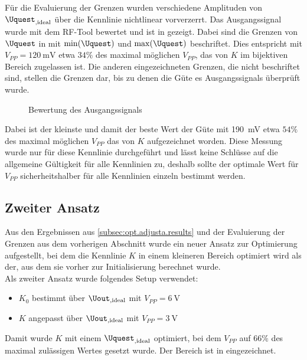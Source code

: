 \documentclass[../Report.tex]{subfiles}
\begin{document}
Für die Evaluierung der Grenzen wurden verschiedene Amplituden von $\Uquest_{,\textrm{ideal}}$ über die Kennlinie nichtlinear vorverzerrt. Das Ausgangssignal wurde mit dem RF-Tool \cite{RF-Tool} bewertet und ist in  gezeigt. Dabei sind die Grenzen von $\Uquest$ in  mit $\min(\Uquest)$ und $\max(\Uquest)$ beschriftet. Dies entspricht mit $V_{PP} = \SI{120}{\mV}$ etwa $34\%$ des maximal möglichen $V_{PP}$, das von $K$ im bijektiven Bereich zugelassen ist. Die anderen eingezeichneten Grenzen, die nicht beschriftet sind, stellen die Grenzen dar, bis zu denen die Güte es Ausgangssignals überprüft wurde.\\
\begin{figure}[H]
\begin{subfigure}{0.5 \textwidth}
	\setlength\figureheight{7.5cm}
	\setlength\figurewidth{7.5cm}
    	
	\label{fig:K0_quality}
\end{subfigure}
\begin{subfigure}{0.5 \textwidth}
	\setlength\figureheight{7.5cm}
	\setlength\figurewidth{7.5cm}
    	
	\label{fig:evaluateK.quality}
\end{subfigure}
\caption{Bewertung des Ausgangssignals}
\label{fig:evaluateK}
\end{figure}
Dabei ist der kleinste und damit der beste Wert der Güte mit \SI{190}{\mV} etwa $54\%$ des maximal möglichen $V_{PP}$ das von $K$ aufgezeichnet worden. Diese Messung wurde nur für diese Kennlinie durchgeführt und lässt keine Schlüsse auf die allgemeine Gültigkeit für alle Kennlinien zu, deshalb sollte der optimale Wert für $V_{PP}$ sicherheitshalber für alle Kennlinien einzeln bestimmt werden.

\subsection{Zweiter Ansatz}
\label{subsubsec:opt.adjusta.kleiner}
Aus den Ergebnissen aus \ref{subsec:opt.adjusta.results} und der Evaluierung der Grenzen aus dem vorherigen Abschnitt wurde ein neuer Ansatz zur Optimierung aufgestellt, bei dem die Kennlinie $K$ in einem kleineren Bereich optimiert wird als der, aus dem sie vorher zur Initialisierung berechnet wurde.\\
Als zweiter Ansatz wurde folgendes Setup verwendet:
\begin{itemize}
	\item $K_0$ bestimmt über $\Uout_{,\textrm{ideal}}$ mit $V_{PP} = \SI{6}{\V}$
	\item $K$ angepasst über $\Uout_{,\textrm{ideal}}$ mit $V_{PP} = \SI{3}{\V}$
\end{itemize}
Damit wurde $K$ mit einem $\Uquest_{,\textrm{ideal}}$ optimiert, bei dem $V_{PP}$ auf $66\%$ des maximal zulässigen Wertes gesetzt wurde. Der Bereich ist in  eingezeichnet.
\end{document}
